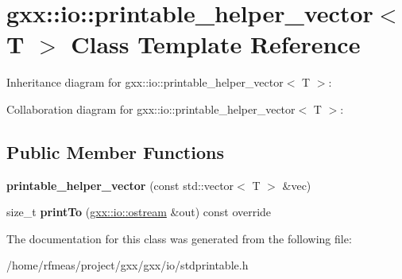 \hypertarget{classgxx_1_1io_1_1printable__helper__vector}{}\section{gxx\+:\+:io\+:\+:printable\+\_\+helper\+\_\+vector$<$ T $>$ Class Template Reference}
\label{classgxx_1_1io_1_1printable__helper__vector}


Inheritance diagram for gxx\+:\+:io\+:\+:printable\+\_\+helper\+\_\+vector$<$ T $>$\+:


Collaboration diagram for gxx\+:\+:io\+:\+:printable\+\_\+helper\+\_\+vector$<$ T $>$\+:
\subsection*{Public Member Functions}
\begin{DoxyCompactItemize}
\item 
{\bfseries printable\+\_\+helper\+\_\+vector} (const std\+::vector$<$ T $>$ \&vec)\hypertarget{classgxx_1_1io_1_1printable__helper__vector_a27dc8e8bf204d5cc034e279f1bb880ca}{}\label{classgxx_1_1io_1_1printable__helper__vector_a27dc8e8bf204d5cc034e279f1bb880ca}

\item 
size\+\_\+t {\bfseries print\+To} (\hyperlink{classgxx_1_1io_1_1ostream}{gxx\+::io\+::ostream} \&out) const override\hypertarget{classgxx_1_1io_1_1printable__helper__vector_af6031a45f445bb49dba809071ea2fcf9}{}\label{classgxx_1_1io_1_1printable__helper__vector_af6031a45f445bb49dba809071ea2fcf9}

\end{DoxyCompactItemize}


The documentation for this class was generated from the following file\+:\begin{DoxyCompactItemize}
\item 
/home/rfmeas/project/gxx/gxx/io/stdprintable.\+h\end{DoxyCompactItemize}
